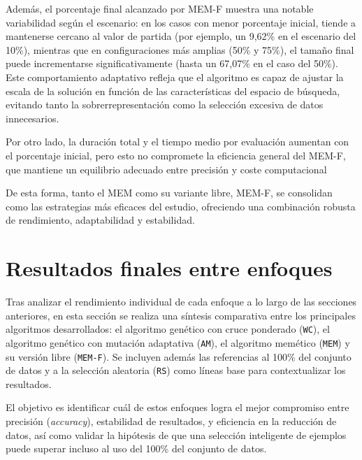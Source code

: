Además, el porcentaje final alcanzado por MEM-F muestra una notable variabilidad según el escenario:
en los casos con menor porcentaje inicial, tiende a mantenerse cercano al valor de partida (por ejemplo, un 9,62\% en el escenario del 10\%),
mientras que en configuraciones más amplias (50\% y 75\%), el tamaño final puede incrementarse significativamente (hasta un 67,07\% en el caso del 50\%).
Este comportamiento adaptativo refleja que el algoritmo es capaz de ajustar la escala de la solución en función de las características del espacio de búsqueda,
evitando tanto la sobrerrepresentación como la selección excesiva de datos innecesarios.

Por otro lado, la duración total y el tiempo medio por evaluación aumentan con el porcentaje inicial, pero esto no compromete la eficiencia general del MEM-F,
que mantiene un equilibrio adecuado entre precisión y coste computacional

De esta forma, tanto el MEM como su variante libre, MEM-F, se consolidan como las estrategias más eficaces del estudio,
ofreciendo una combinación robusta de rendimiento, adaptabilidad y estabilidad.


\section{Resultados finales entre enfoques}\label{sec:comparacion-final-enfoques}
Tras analizar el rendimiento individual de cada enfoque a lo largo de las secciones anteriores,
en esta sección se realiza una síntesis comparativa entre los principales algoritmos desarrollados: el algoritmo genético con cruce ponderado (\texttt{WC}), el algoritmo genético con mutación adaptativa (\texttt{AM}), el algoritmo memético (\texttt{MEM}) y su versión libre (\texttt{MEM-F}).
Se incluyen además las referencias al 100\% del conjunto de datos y a la selección aleatoria (\texttt{RS})
como líneas base para contextualizar los resultados.

El objetivo es identificar cuál de estos enfoques logra el mejor compromiso entre precisión (\textit{accuracy}),
estabilidad de resultados, y eficiencia en la reducción de datos, así como validar la hipótesis de que una selección inteligente de ejemplos puede superar incluso al uso del 100\% del conjunto de datos.

